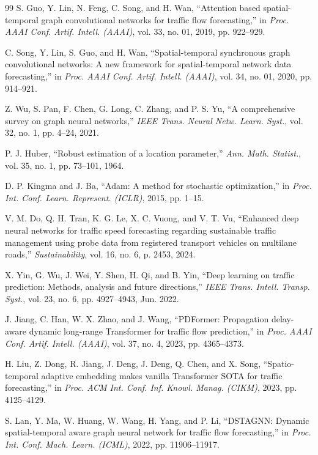 \documentclass[journal,twocolumn]{IEEEtran}
\begin{document}
\begin{thebibliography}{99}
S. Guo, Y. Lin, N. Feng, C. Song, and H. Wan, ``Attention based spatial-temporal graph convolutional networks for traffic flow forecasting,'' in \emph{Proc. AAAI Conf. Artif. Intell. (AAAI)}, vol. 33, no. 01, 2019, pp. 922--929.

C. Song, Y. Lin, S. Guo, and H. Wan, ``Spatial-temporal synchronous graph convolutional networks: A new framework for spatial-temporal network data forecasting,'' in \emph{Proc. AAAI Conf. Artif. Intell. (AAAI)}, vol. 34, no. 01, 2020, pp. 914--921.

Z. Wu, S. Pan, F. Chen, G. Long, C. Zhang, and P. S. Yu, ``A comprehensive survey on graph neural networks,'' \emph{IEEE Trans. Neural Netw. Learn. Syst.}, vol. 32, no. 1, pp. 4--24, 2021.

P. J. Huber, ``Robust estimation of a location parameter,'' \emph{Ann. Math. Statist.}, vol. 35, no. 1, pp. 73--101, 1964.

D. P. Kingma and J. Ba, ``Adam: A method for stochastic optimization,'' in \emph{Proc. Int. Conf. Learn. Represent. (ICLR)}, 2015, pp. 1--15.

V. M. Do, Q. H. Tran, K. G. Le, X. C. Vuong, and V. T. Vu, ``Enhanced deep neural networks for traffic speed forecasting regarding sustainable traffic management using probe data from registered transport vehicles on multilane roads,'' \emph{Sustainability}, vol. 16, no. 6, p. 2453, 2024.

X. Yin, G. Wu, J. Wei, Y. Shen, H. Qi, and B. Yin, ``Deep learning on traffic prediction: Methods, analysis and future directions,'' \emph{IEEE Trans. Intell. Transp. Syst.}, vol. 23, no. 6, pp. 4927--4943, Jun. 2022.

J. Jiang, C. Han, W. X. Zhao, and J. Wang, ``PDFormer: Propagation delay-aware dynamic long-range Transformer for traffic flow prediction,'' in \emph{Proc. AAAI Conf. Artif. Intell. (AAAI)}, vol. 37, no. 4, 2023, pp. 4365--4373.

H. Liu, Z. Dong, R. Jiang, J. Deng, J. Deng, Q. Chen, and X. Song, ``Spatio-temporal adaptive embedding makes vanilla Transformer SOTA for traffic forecasting,'' in \emph{Proc. ACM Int. Conf. Inf. Knowl. Manag. (CIKM)}, 2023, pp. 4125--4129.

S. Lan, Y. Ma, W. Huang, W. Wang, H. Yang, and P. Li, ``DSTAGNN: Dynamic spatial-temporal aware graph neural network for traffic flow forecasting,'' in \emph{Proc. Int. Conf. Mach. Learn. (ICML)}, 2022, pp. 11906--11917.


\end{thebibliography}
\end{document}
